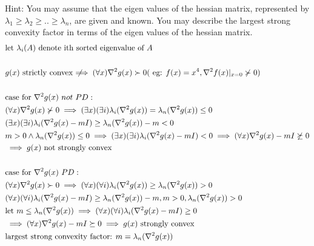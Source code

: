 \documentclass[12pt,letter]{article}
\newcommand{\notimplies}{\;\not\!\!\!\implies}
\begin{document}
\begin{enumerate}
\begin{enumerate}
    Hint: You may assume that the eigen values of the hessian matrix, represented by $\lambda_1 \geq
    \lambda_2 \geq .. \geq \lambda_n$, are given and known. You may describe the largest strong convexity factor in terms of the eigen values of the hessian matrix.    
    \begin{align*}
      &\text{let }\lambda_i(A) \text{ denote ith sorted eigenvalue of }A\\
      \\
      &g(x) \text{ strictly convex} \notimplies (\forall x) \nabla^2 g(x) \succ 0 (\text{ eg: } f(x) = x^4, \nabla^2f(x)|_{x=0} \not\succ 0 )\\
      \\
      &\text{case for } \nabla^2 g(x)\ not\ PD:\\
      &(\forall x) \nabla^2 g(x) \not\succ 0 \implies (\exists x)(\exists i)\lambda_i(\nabla^2 g(x)) = \lambda_n(\nabla^2 g(x))\leq 0\\
      &(\exists x)(\exists i)\lambda_i(\nabla^2 g(x) -mI) \geq \lambda_n(\nabla^2 g(x)) - m < 0\\
      &m > 0 \wedge \lambda_n(\nabla^2 g(x)) \leq 0 \implies (\exists x)(\exists i)\lambda_i(\nabla^2 g(x) -mI) < 0 \implies (\forall x) \nabla^2 g(x) -mI \not \succeq 0\\
      &\implies g(x) \text{ not strongly convex}\\
      \\
      &\text{case for } \nabla^2 g(x)\ PD:\\
      &(\forall x) \nabla^2 g(x) \succ 0 \implies (\forall x)(\forall i)\lambda_i(\nabla^2 g(x)) \geq \lambda_n(\nabla^2 g(x)) > 0\\
      &(\forall x)(\forall i)\lambda_i(\nabla^2 g(x) -mI) \geq \lambda_n(\nabla^2 g(x)) - m, m >0, \lambda_n(\nabla^2 g(x))>0\\
      &\text{let }m \leq \lambda_n(\nabla^2 g(x)) \implies (\forall x)(\forall i)\lambda_i(\nabla^2 g(x) -mI) \geq 0\\
      &\implies (\forall x) \nabla^2 g(x) -mI \succeq 0 \implies g(x) \text{ strongly convex}\\
      &\text{largest strong convexity factor: } m = \lambda_n(\nabla^2 g(x))
    \end{align*}
  \end{enumerate}

  \pagebreak
  

\end{enumerate}
\end{document}
